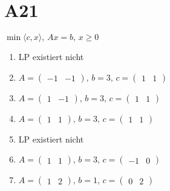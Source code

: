 \documentclass[fleqn,12pt]{scrartcl}
\begin{document}
\section{A21}
$\min \langle c, x \rangle, \, Ax = b, \, x \geq 0$
\begin{enumerate}
	\item
	 LP existiert nicht
 \item
 $A= \begin{pmatrix} -1 & -1 \end{pmatrix}, \, b = 3, \, c = \begin{pmatrix} 1 & 1 \end{pmatrix}$
 \item
 $A= \begin{pmatrix} 1 & -1 \end{pmatrix}, \, b = 3, \, c = \begin{pmatrix} 1 & 1 \end{pmatrix}$
 \item
 $A= \begin{pmatrix} 1 & 1 \end{pmatrix}, \, b = 3, \, c = \begin{pmatrix} 1 & 1 \end{pmatrix}$
 \item
	 LP existiert nicht
 \item
 $A= \begin{pmatrix} 1 & 1 \end{pmatrix}, \, b = 3, \, c = \begin{pmatrix} -1 & 0 \end{pmatrix}$
 \item
 $A= \begin{pmatrix} 1 & 2 \end{pmatrix}, \, b = 1, \, c = \begin{pmatrix} 0 & 2 \end{pmatrix}$
\end{enumerate}
\end{document}
